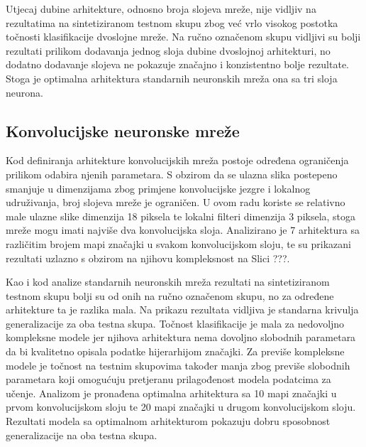 \documentclass[lmodern, utf8, diplomski, numeric]{fer}
\begin{document}
Utjecaj dubine arhitekture, odnosno broja slojeva mreže, nije vidljiv na rezultatima na sintetiziranom testnom skupu zbog već vrlo visokog postotka točnosti klasifikacije dvoslojne mreže. Na ručno označenom skupu vidljivi su bolji rezultati prilikom dodavanja jednog sloja dubine dvoslojnoj arhitekturi, no dodatno dodavanje slojeva ne pokazuje značajno i konzistentno bolje rezultate. Stoga je optimalna arhitektura standarnih neuronskih mreža ona sa tri sloja neurona.

\subsection{Konvolucijske neuronske mreže}

Kod definiranja arhitekture konvolucijskih mreža postoje određena ograničenja prilikom odabira njenih parametara. S obzirom da se ulazna slika postepeno smanjuje u dimenzijama zbog primjene konvolucijske jezgre i lokalnog udruživanja, broj slojeva mreže je ograničen. U ovom radu koriste se relativno male ulazne slike dimenzija 18 piksela te lokalni filteri dimenzija 3 piksela, stoga mreže mogu imati najviše dva konvolucijska sloja. Analizirano je 7 arhitektura sa različitim brojem mapi značajki u svakom konvolucijskom sloju, te su prikazani rezultati uzlazno s obzirom na njihovu kompleksnost na Slici ???.

\begin{figure}[ht!]
\begin{center}
    
    \caption{}
\end{center}
\end{figure}

Kao i kod analize standarnih neuronskih mreža rezultati na sintetiziranom testnom skupu bolji su od onih na ručno označenom skupu, no za određene arhitekture ta je razlika mala. Na prikazu rezultata vidljiva je standarna krivulja generalizacije za oba testna skupa. Točnost klasifikacije je mala za nedovoljno kompleksne modele jer njihova arhitektura nema dovoljno slobodnih parametara da bi kvalitetno opisala podatke hijerarhijom značajki. Za previše kompleksne modele je točnost na testnim skupovima također manja zbog previše slobodnih parametara koji omogućuju pretjeranu prilagođenost modela podatcima za učenje. Analizom je pronađena optimalna arhitektura sa 10 mapi značajki u prvom konvolucijskom sloju te 20 mapi značajki u drugom konvolucijskom sloju. Rezultati modela sa optimalnom arhitekturom pokazuju dobru sposobnost generalizacije na oba testna skupa.
\end{document}
